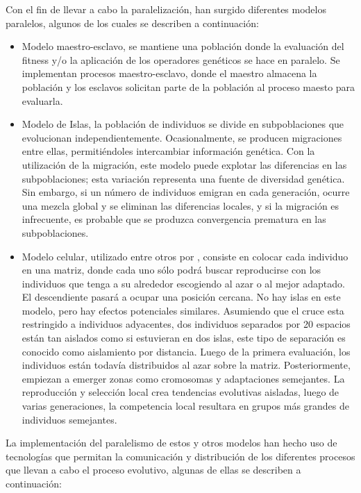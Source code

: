 Con el fin de llevar a cabo la paralelizaci\'on, han surgido diferentes modelos paralelos, algunos de los cuales se describen a continuación:

\begin{itemize}
	\item Modelo maestro-esclavo, se mantiene una población donde la evaluación del fitness y/o la aplicación de los operadores genéticos se hace en paralelo. Se implementan procesos maestro-esclavo, donde el maestro almacena la población y los esclavos solicitan parte de la población al proceso maesto para evaluarla.
	\item Modelo de Islas, la población de individuos se divide en subpoblaciones que evolucionan independientemente. Ocasionalmente, se producen migraciones entre ellas, permitiéndoles intercambiar información genética. Con la utilización de la migración, este modelo puede explotar las diferencias en las subpoblaciones; esta variación representa una fuente de diversidad genética. Sin embargo, si un número de individuos emigran en cada generación, ocurre una mezcla global y se eliminan las diferencias locales, y si la migración es infrecuente, es probable que se produzca convergencia prematura en las subpoblaciones.
	\item Modelo celular, utilizado entre otros por \cite{DBLP:journals/tec/FolinoPS03}, consiste en colocar cada individuo en una matriz, donde cada uno sólo podrá buscar reproducirse con los individuos que tenga a su alrededor escogiendo al azar o al mejor adaptado. El descendiente pasar\'a a ocupar una posición cercana. No hay islas en este modelo, pero hay efectos potenciales similares. Asumiendo que el cruce esta restringido a individuos adyacentes, dos individuos separados por 20 espacios están tan aislados como si estuvieran en dos islas, este tipo de separación es conocido como aislamiento por distancia. Luego de la primera evaluación, los individuos están todavía distribuidos al azar sobre la matriz. Posteriormente, empiezan a emerger zonas como cromosomas y adaptaciones semejantes. La reproducción y selección local crea tendencias evolutivas aisladas, luego de varias generaciones, la competencia local resultara en grupos m\'as grandes de individuos semejantes.
\end{itemize}

La implementación del paralelismo de estos y otros modelos han hecho uso de tecnologías que permitan la comunicación y distribución de los diferentes procesos que llevan a cabo el proceso evolutivo, algunas de ellas se describen a continuación:

